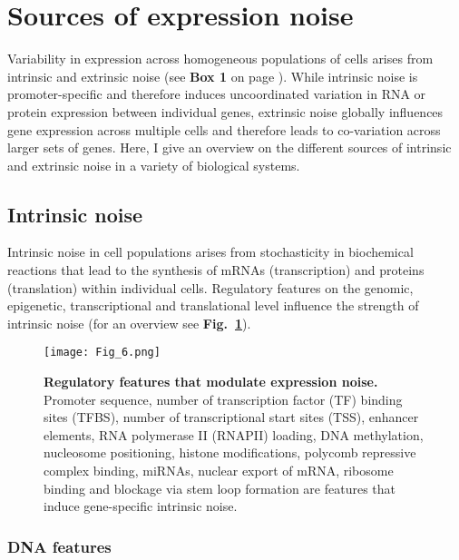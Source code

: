 
\section{Sources of expression noise} 

Variability in expression across homogeneous populations of cells arises from intrinsic and extrinsic noise (see \textbf{Box 1} on page \pageref{box1}). While intrinsic noise is promoter-specific and therefore induces uncoordinated variation in RNA or protein expression between individual genes, extrinsic noise globally influences gene expression across multiple cells and therefore leads to co-variation across larger sets of genes. Here, I give an overview on the different sources of intrinsic and extrinsic noise in a variety of biological systems.

\subsection{Intrinsic noise}

Intrinsic noise in cell populations arises from stochasticity in biochemical reactions that lead to the synthesis of mRNAs (transcription) and proteins (translation) within individual cells. Regulatory features on the genomic, epigenetic, transcriptional and translational level influence the strength of intrinsic noise (for an overview see \textbf{Fig.~\ref{fig0:overview_intrinsic}}).

\begin{figure}[!h]
\centering
\texttt{[image: Fig\_6.png]}
\caption[Regulatory features that modulate expression noise]{\textbf{Regulatory features that modulate expression noise.}\\
Promoter sequence, number of transcription factor (TF) binding sites (TFBS), number of transcriptional start sites (TSS), enhancer elements, RNA polymerase II (RNAPII) loading, DNA methylation, nucleosome positioning, histone modifications, polycomb repressive complex binding, \glspl{miRNA}, nuclear export of mRNA, ribosome binding and blockage via stem loop formation are features that induce gene-specific intrinsic noise.}
\label{fig0:overview_intrinsic}
\end{figure}

\subsubsection{DNA features}

